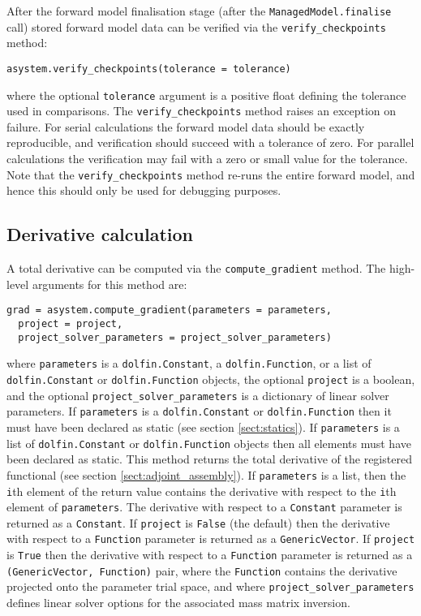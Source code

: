 \documentclass[a4paper]{book}
\begin{document}
After the forward model finalisation stage (after the \linebreak
\verb+ManagedModel.finalise+ call) stored forward model data can be verified via
the \verb+verify_checkpoints+ method:
\begin{lstlisting}
asystem.verify_checkpoints(tolerance = tolerance)
\end{lstlisting}
where the optional \verb+tolerance+ argument is a positive float defining the
tolerance used in comparisons. The \verb+verify_checkpoints+ method raises an
exception on failure. For serial calculations the forward model data should be
exactly reproducible, and verification should succeed with a tolerance of zero.
For parallel calculations the verification may fail with a zero or small value
for the tolerance. Note that the \verb+verify_checkpoints+ method re-runs the
entire forward model, and hence this should only be used for debugging purposes.

\subsection{Derivative calculation}

A total derivative can be computed via the \verb+compute_gradient+ method. The
high-level arguments for this method are:
\begin{lstlisting}
grad = asystem.compute_gradient(parameters = parameters,
  project = project,
  project_solver_parameters = project_solver_parameters)
\end{lstlisting}
where \verb+parameters+ is a \verb+dolfin.Constant+, a \verb+dolfin.Function+,
or a list of \verb+dolfin.Constant+ or \verb+dolfin.Function+ objects, the
optional \verb+project+ is a \linebreak boolean, and the optional
\verb+project_solver_parameters+ is a dictionary of linear solver parameters. If
\verb+parameters+ is a \verb+dolfin.Constant+ or \verb+dolfin.Function+ then it
must have been declared as static (see section \ref{sect:statics}). If
\verb+parameters+ is a list of \verb+dolfin.Constant+ or \verb+dolfin.Function+
objects then all elements must have been declared as static. This method returns
the total derivative of the registered functional (see section
\ref{sect:adjoint_assembly}). If \verb+parameters+ is a list, then the
\verb+i+th element of the return value contains the derivative with respect to
the \verb+i+th element of \verb+parameters+. The derivative with respect to a
\verb+Constant+ parameter is returned as a \verb+Constant+. If \verb+project+ is
\verb+False+ (the default) then the derivative with respect to a \verb+Function+
parameter is returned as a \verb+GenericVector+. If \verb+project+ is
\verb+True+ then the derivative with respect to a \verb+Function+ parameter is
returned as a \verb+(GenericVector, Function)+ pair, where the \verb+Function+
contains the derivative projected onto the parameter trial space, and where
\verb+project_solver_parameters+ defines linear solver options for the
associated mass matrix inversion.
\end{document}
